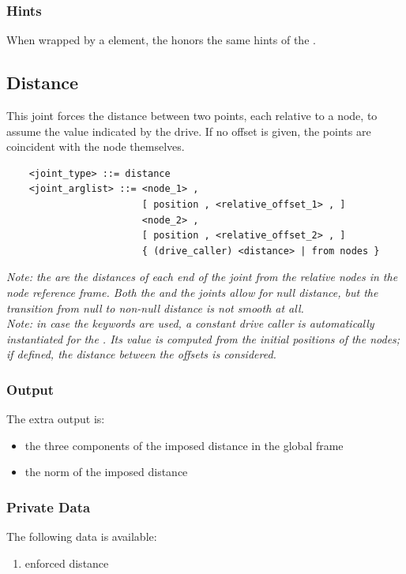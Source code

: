 \subsubsection{Hints}
When wrapped by a  element, the 
honors the same hints of the .




\subsection{Distance}
This joint forces the distance between two points,
each relative to a node, to assume the value indicated by the drive.
If no offset is given, the points are coincident with the node themselves.
\begin{verbatim}
    <joint_type> ::= distance 
    <joint_arglist> ::= <node_1> , 
                        [ position , <relative_offset_1> , ]
                        <node_2> ,
                        [ position , <relative_offset_2> , ]
                        { (drive_caller) <distance> | from nodes }
\end{verbatim}

\noindent
{\em 
    Note: the  are the distances of each end
    of the joint from the relative nodes in the node reference frame.
    Both the  and the  joints
    allow for null distance, but the transition from null to non-null
    distance is not smooth at all.
} \\
{\em
    Note: in case the keywords  are used, a constant drive
    caller is automatically instantiated for the . 
    Its value is computed from the initial positions of the nodes;
    if defined, the distance between the offsets is considered. 
}

\subsubsection{Output}
The extra output is:
\begin{itemize}
    \item the three components of the imposed distance in the global frame
    \item the norm of the imposed distance
\end{itemize}

\subsubsection{Private Data}
The following data is available:
\begin{enumerate}
\item {} enforced distance
\end{enumerate}

